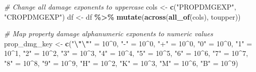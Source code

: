 \documentclass[
]{article}
\newenvironment{Shaded}{\begin{snugshade}}{\end{snugshade}}
\newcommand{\CommentTok}[1]{\textcolor[rgb]{0.56,0.35,0.01}{\textit{#1}}}
\newcommand{\DecValTok}[1]{\textcolor[rgb]{0.00,0.00,0.81}{#1}}
\newcommand{\FunctionTok}[1]{\textcolor[rgb]{0.13,0.29,0.53}{\textbf{#1}}}
\newcommand{\NormalTok}[1]{#1}
\newcommand{\OtherTok}[1]{\textcolor[rgb]{0.56,0.35,0.01}{#1}}
\newcommand{\SpecialCharTok}[1]{\textcolor[rgb]{0.81,0.36,0.00}{\textbf{#1}}}
\newcommand{\StringTok}[1]{\textcolor[rgb]{0.31,0.60,0.02}{#1}}
\begin{document}
\begin{Shaded}
\begin{Highlighting}[]
\CommentTok{\# Change all damage exponents to uppercase}
\NormalTok{cols }\OtherTok{\textless{}{-}} \FunctionTok{c}\NormalTok{(}\StringTok{"PROPDMGEXP"}\NormalTok{, }\StringTok{"CROPDMGEXP"}\NormalTok{)}
\NormalTok{df }\OtherTok{\textless{}{-}}\NormalTok{ df }\SpecialCharTok{\%\textgreater{}\%}
  \FunctionTok{mutate}\NormalTok{(}\FunctionTok{across}\NormalTok{(}\FunctionTok{all\_of}\NormalTok{(cols), toupper))}

\CommentTok{\# Map property damage alphanumeric exponents to numeric values}
\NormalTok{prop\_dmg\_key }\OtherTok{\textless{}{-}}  \FunctionTok{c}\NormalTok{(}\StringTok{"}\SpecialCharTok{\textbackslash{}"\textbackslash{}"}\StringTok{"} \OtherTok{=} \DecValTok{10}\SpecialCharTok{\^{}}\DecValTok{0}\NormalTok{,}
                   \StringTok{"{-}"} \OtherTok{=} \DecValTok{10}\SpecialCharTok{\^{}}\DecValTok{0}\NormalTok{, }
                   \StringTok{"+"} \OtherTok{=} \DecValTok{10}\SpecialCharTok{\^{}}\DecValTok{0}\NormalTok{,}
                   \StringTok{"0"} \OtherTok{=} \DecValTok{10}\SpecialCharTok{\^{}}\DecValTok{0}\NormalTok{,}
                   \StringTok{"1"} \OtherTok{=} \DecValTok{10}\SpecialCharTok{\^{}}\DecValTok{1}\NormalTok{,}
                   \StringTok{"2"} \OtherTok{=} \DecValTok{10}\SpecialCharTok{\^{}}\DecValTok{2}\NormalTok{,}
                   \StringTok{"3"} \OtherTok{=} \DecValTok{10}\SpecialCharTok{\^{}}\DecValTok{3}\NormalTok{,}
                   \StringTok{"4"} \OtherTok{=} \DecValTok{10}\SpecialCharTok{\^{}}\DecValTok{4}\NormalTok{,}
                   \StringTok{"5"} \OtherTok{=} \DecValTok{10}\SpecialCharTok{\^{}}\DecValTok{5}\NormalTok{,}
                   \StringTok{"6"} \OtherTok{=} \DecValTok{10}\SpecialCharTok{\^{}}\DecValTok{6}\NormalTok{,}
                   \StringTok{"7"} \OtherTok{=} \DecValTok{10}\SpecialCharTok{\^{}}\DecValTok{7}\NormalTok{,}
                   \StringTok{"8"} \OtherTok{=} \DecValTok{10}\SpecialCharTok{\^{}}\DecValTok{8}\NormalTok{,}
                   \StringTok{"9"} \OtherTok{=} \DecValTok{10}\SpecialCharTok{\^{}}\DecValTok{9}\NormalTok{,}
                   \StringTok{"H"} \OtherTok{=} \DecValTok{10}\SpecialCharTok{\^{}}\DecValTok{2}\NormalTok{,}
                   \StringTok{"K"} \OtherTok{=} \DecValTok{10}\SpecialCharTok{\^{}}\DecValTok{3}\NormalTok{,}
                   \StringTok{"M"} \OtherTok{=} \DecValTok{10}\SpecialCharTok{\^{}}\DecValTok{6}\NormalTok{,}
                   \StringTok{"B"} \OtherTok{=} \DecValTok{10}\SpecialCharTok{\^{}}\DecValTok{9}\NormalTok{)}


\end{Highlighting}
\end{Shaded}
\end{document}
